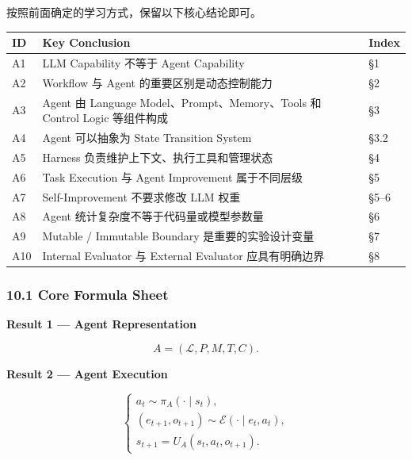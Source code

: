 按照前面确定的学习方式，保留以下核心结论即可。

\begin{readertable}
\begin{longtable}[]{@{}
  >{\raggedright\arraybackslash}p{}
  >{\raggedright\arraybackslash}p{}
  >{\raggedright\arraybackslash}p{}@{}}
\toprule
ID & Key Conclusion & Index \\
\midrule
\endhead
A1 & LLM Capability 不等于 Agent Capability & §1 \\
A2 & Workflow 与 Agent 的重要区别是动态控制能力 & §2 \\
A3 & Agent 由 Language Model、Prompt、Memory、Tools 和 Control Logic 等组件构成 & §3 \\
A4 & Agent 可以抽象为 State Transition System & §3.2 \\
A5 & Harness 负责维护上下文、执行工具和管理状态 & §4 \\
A6 & Task Execution 与 Agent Improvement 属于不同层级 & §5 \\
A7 & Self-Improvement 不要求修改 LLM 权重 & §5--6 \\
A8 & Agent 统计复杂度不等于代码量或模型参数量 & §6 \\
A9 & Mutable / Immutable Boundary 是重要的实验设计变量 & §7 \\
A10 & Internal Evaluator 与 External Evaluator 应具有明确边界 & §8 \\
\bottomrule
\end{longtable}
\end{readertable}

\hypertarget{part-3-31-0001-core-formula-sheet}{%
\subsubsection{10.1 Core Formula Sheet}\label{part-3-31-0001-core-formula-sheet}}

\textbf{Result 1 --- Agent Representation}

\[A=(\mathcal L,P,M,T,C).\]

\textbf{Result 2 --- Agent Execution}

\[\begin{cases}
a_t\sim\pi_A(\cdot\mid s_t),\\
(e_{t+1},o_{t+1})\sim
\mathcal E(\cdot\mid e_t,a_t),\\
s_{t+1}=U_A(s_t,a_t,o_{t+1}).
\end{cases}\]

